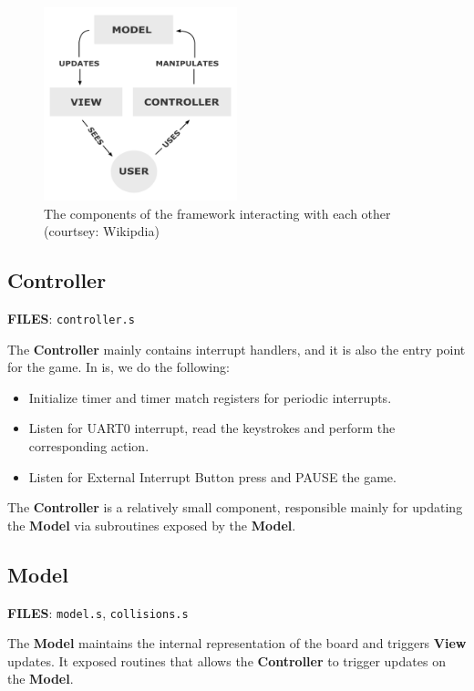 \begin{figure}[H]
  \centering
  \includegraphics[width=0.5\textwidth]{images/mvc-process.png}
  \caption{\label{fig:mvc-process} The components of the framework interacting with each other (courtsey: Wikipdia)}
\end{figure}

  \subsection{Controller}

  \quad\textbf{FILES}: \texttt{controller.s}

  The \textbf{Controller} mainly contains interrupt handlers, and it is also the entry point for the game.
  In is, we do the following:

  \begin{itemize}
    \item Initialize timer and timer match registers for periodic interrupts.
    \item Listen for UART0 interrupt, read the keystrokes and perform the corresponding action.
    \item Listen for External Interrupt Button press and PAUSE the game.
  \end{itemize}

  The \textbf{Controller} is a relatively small component, responsible mainly for updating the \textbf{Model} via subroutines exposed by the \textbf{Model}.

  \subsection{Model}

  \textbf{FILES}: \texttt{model.s}, \texttt{collisions.s}

  The \textbf{Model} maintains the internal representation of the board and triggers \textbf{View} updates. It exposed routines that allows the
  \textbf{Controller} to trigger updates on the \textbf{Model}.

